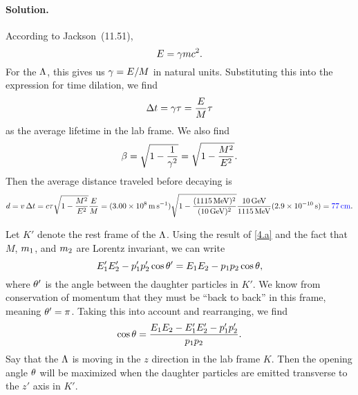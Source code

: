 \documentclass[11pt]{article}
\newcommand{\beq}{\begin{equation*}}
\newcommand{\eeq}{\end{equation*}}
\newcommand{\beqn}{\begin{equation}}
\newcommand{\eeqn}{\end{equation}}
\newenvironment{solution}
{
	\paragraph{Solution.}
	\ignorespaces
}
{
    \bigskip
}
\begin{document}
\begin{solution}
	According to Jackson~(11.51),
	\beq
		E = \gam m c^2.
	\eeq
	For the $\Lambda$, this gives us $\gamma = E / M$ in natural units.  Substituting this into the expression for time dilation, we find
	\beq
		\Delt = \gam \tau
		= \frac{E}{M} \tau
	\eeq
	as the average lifetime in the lab frame.  We also find
	\beq
		\bet = \sqrt{1 - \frac{1}{\gam^2}}
		= \sqrt{1 - \frac{M^2}{E^2}}.
	\eeq
	Then the average distance traveled before decaying is
	\beq
		d = v \,\Delt
		= c \tau \sqrt{1 - \frac{M^2}{E^2}} \frac{E}{M}
		= (\lspeed) \sqrt{1 - \frac{(\mLam)^2}{(\ELam)^2}} \frac{\ELam}{\mLam} (\tauLam)
		= {\color{blue} \SI{77}{\cm}}.
	\eeq
	
	Let $K'$ denote the rest frame of the $\Lambda$.  Using the result of \ref{4.a} and the fact that $M$, $m_1$, and $m_2$ are Lorentz invariant, we can write
	\beqn \label{thing4}
		\Eq' \Ew' - \pq' \pw' \cos\tht' = \Eq \Ew - \pq \pw \cos\tht,
	\eeqn
	where $\theta'$ is the angle between the daughter particles in $K'$.  We know from conservation of momentum that they must be ``back to back'' in this frame, meaning $\theta' = \pi$.  Taking this into account and rearranging, we find
	\beqn \label{thing4.2}
		\cos\tht = \frac{\Eq \Ew - \Eq' \Ew' - \pq' \pw'}{\pq \pw}.
	\eeqn
	Say that the $\Lambda$ is moving in the $z$ direction in the lab frame $K$.  Then the opening angle $\theta$ will be maximized when the daughter particles are emitted transverse to the $z'$ axis in $K'$.
	

\end{solution}
\end{document}
